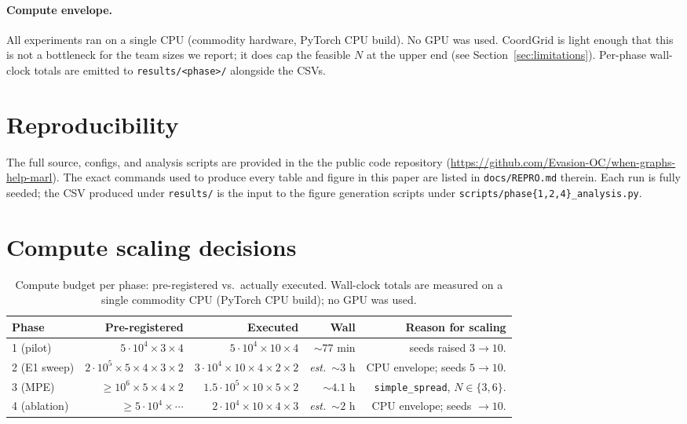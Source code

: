 \documentclass[manuscript, screen, review]{jair}
\begin{document}
\paragraph{Compute envelope.} All experiments ran on a single CPU
(commodity hardware, PyTorch CPU build). No GPU was
used. CoordGrid is light enough that this is not a bottleneck for the
team sizes we report; it does cap the feasible $N$ at the upper
end (see Section~\ref{sec:limitations}). Per-phase wall-clock totals are
emitted to \texttt{results/<phase>/} alongside the CSVs.

\section{Reproducibility}
\label{app:repro}

The full source, configs, and analysis scripts are provided in the
the public code repository (\url{https://github.com/Evasion-OC/when-graphs-help-marl}). The exact commands used to produce every
table and figure in this paper are listed in \texttt{docs/REPRO.md} therein. Each run is fully seeded; the
CSV produced under \texttt{results/} is the input to the figure generation
scripts under \texttt{scripts/phase\{1,2,4\}\_analysis.py}.

\section{Compute scaling decisions}
\label{app:budget}

\begin{table}[!ht]
  \centering
  \caption{Compute budget per phase: pre-registered vs.\ actually executed.
  Wall-clock totals are measured on a single commodity CPU (PyTorch CPU
  build); no GPU was used.}
  \label{tab:budget}
  \small
  \begin{tabular}{lrrrr}
    \toprule
    Phase & Pre-registered & Executed & Wall & Reason for scaling \\
    \midrule
    1 (pilot)       & $5\cdot 10^4 \times 3 \times 4$  & $5\cdot 10^4 \times 10 \times 4$ & $\sim 77$ min &
                      seeds raised $3\!\to\!10$. \\
    2 (E1 sweep)    & $2\cdot 10^5 \times 5 \times 4 \times 3 \times 2$ & $3\cdot 10^4 \times 10 \times 4 \times 2 \times 2$
                    & \emph{est.}\ ${\sim}3$ h & CPU envelope; seeds $5\!\to\!10$. \\
    3 (MPE)         & $\geq 10^6 \times 5 \times 4 \times 2$ & $1.5{\cdot}10^5 \times 10 \times 5 \times 2$
                    & ${\sim}4.1$ h & \texttt{simple\_spread}, $N\in\{3,6\}$. \\
    4 (ablation)    & $\geq 5\cdot 10^4 \times \cdots$  & $2\cdot 10^4 \times 10 \times 4 \times 3$
                    & \emph{est.}\ ${\sim}2$ h & CPU envelope; seeds $\to 10$. \\
    \bottomrule
  \end{tabular}
\end{table}
\end{document}
